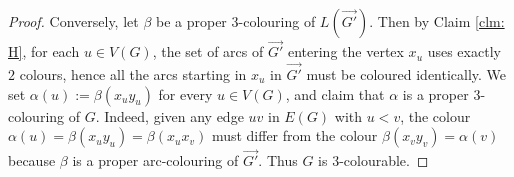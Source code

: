 \documentclass[11pt,a4aper]{article}
\renewcommand{\geq}{\geqslant}
\DeclareRobustCommand*{\ora}{\overrightarrow}
\newcommand*{\orGp}{\ora{G'}}
\newcommand*{\orH}{\ora{H}}
\newcommand*{\orGu}{\ora{G_1}}
\newcommand*{\orGd}{\ora{G_d}}
\begin{document}
\begin{proof}
  Conversely, let $\beta$ be a proper 3-colouring of $L(\orGp)$. Then by Claim \ref{clm: H}, for each $u\in V(G)$, the set of
  arcs of $\orGp$ entering the vertex $x_u$ uses exactly $2$ colours, hence all the
  arcs starting in $x_u$ in $\orGp$ must be coloured identically. We set
  $\alpha(u) := \beta(x_uy_u)$ for every $u\in V(G)$, and claim that $\alpha$ is a
  proper 3-colouring of $G$. Indeed, given any edge $uv$ in $E(G)$ with $u<v$,
  the colour $\alpha(u) = \beta(x_uy_u) =\beta(x_ux_v)$ must differ from the
  colour $\beta(x_vy_v) = \alpha(v)$ because $\beta$ is a proper
  arc-colouring of $\orGp$. Thus $G$ is 3-colourable.
\end{proof}
\end{document}
